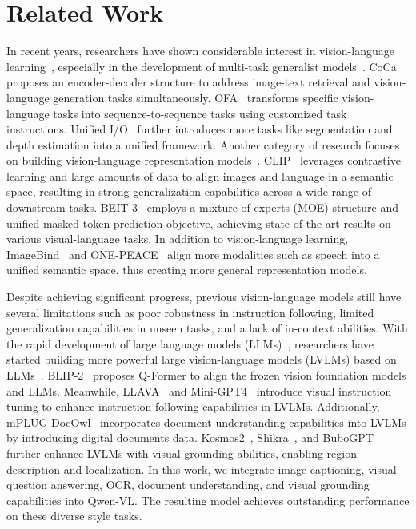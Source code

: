 \documentclass{article}
\begin{document}
\section{Related Work}
In recent years, researchers have shown considerable interest in vision-language learning~\citep{vlbert,uniter,oscar,vinvl,unimo,m6,vilt,fiber,xvlm,albef,blip}, especially in the development of multi-task generalist models~\citep{unit,flava,uni-perceiver,coca,wang2022ofa,unified_io,bai2022ofasys}.
CoCa~\citep{coca} proposes an encoder-decoder structure to address image-text retrieval and vision-language generation tasks simultaneously. 
OFA~\citep{wang2022ofa} transforms specific vision-language tasks into sequence-to-sequence tasks using customized task instructions. 
Unified I/O~\citep{unified_io} further introduces more tasks like segmentation and depth estimation into a unified framework.
Another category of research focuses on building vision-language representation models~\citep{clip,align,lit,florence,chinese_clip}.
CLIP~\citep{clip} leverages contrastive learning and large amounts of data to align images and language in a semantic space, resulting in strong generalization capabilities across a wide range of downstream tasks. 
BEIT-3~\citep{beit3} employs a mixture-of-experts (MOE) structure and unified masked token prediction objective, achieving state-of-the-art results on various visual-language tasks. 
In addition to vision-language learning, ImageBind~\citep{imagebind} and ONE-PEACE~\citep{one-peace} align more modalities such as speech into a unified semantic space, thus creating more general representation models.

Despite achieving significant progress, previous vision-language models still have several limitations such as poor robustness in instruction following, limited generalization capabilities in unseen tasks, and a lack of in-context abilities. With the rapid development of large language models (LLMs)~\citep{gpt3,gpt4,anil2023palm,gao2023llama,qwen7b}, researchers have started building more powerful large vision-language models (LVLMs) based on LLMs~\citep{alayrac2022flamingo,chen2022pali, blip2,dai2023instructblip,kosmos,kosmos2,zhu2023minigpt,liu2023visual,ye2023mplug,mPLUG-DocOwl,shikra,li2023otter,videollama,emu}. 
BLIP-2~\citep{blip2} proposes Q-Former to align the frozen vision foundation models and LLMs.
Meanwhile, LLAVA~\citep{liu2023visual} and Mini-GPT4~\citep{zhu2023minigpt} introduce visual instruction tuning to enhance instruction following capabilities in LVLMs. 
Additionally, mPLUG-DocOwl~\citep{mPLUG-DocOwl} incorporates document understanding capabilities into LVLMs by introducing digital documents data. 
Kosmos2~\citep{kosmos2}, Shikra~\citep{shikra}, and BuboGPT~\citep{bubogpt} further enhance LVLMs with visual grounding abilities, enabling region description and localization.
In this work, we integrate image captioning, visual question answering, OCR, document understanding, and visual grounding capabilities into Qwen-VL. The resulting model achieves outstanding performance on these diverse style tasks.
\end{document}
